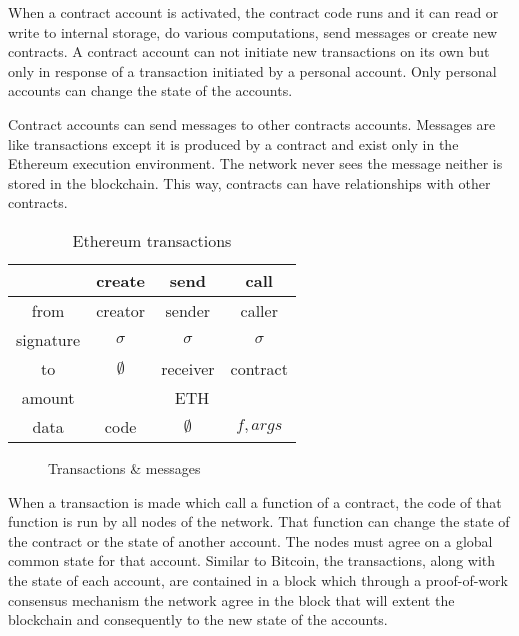 When a contract account is activated, the contract code runs and it can read or write to internal storage, do various computations, send messages or create new contracts. A contract account can not initiate new transactions on its own but only in response of a transaction initiated by a personal account. Only personal accounts can change the state of the accounts.

Contract accounts can send messages to other contracts accounts. Messages are like transactions except it is produced by a contract and exist only in the Ethereum execution environment. The network never sees the message neither is stored in the blockchain. This way, contracts can have relationships with other contracts.

\begin{table}[!ht]
  \centering
  \begin{tabular}{|c|c|c|c|}
  \hline
   & create & send & call \\ \hline
   from & creator & sender & caller \\ \hline
   signature & $\sigma$ & $\sigma$ & $\sigma$ \\ \hline
   to & $\emptyset$ & receiver & contract \\ \hline
   amount & \multicolumn{3}{c|}{ETH} \\ \hline
   data & code & $\emptyset$ & $f, args$ \\ \hline
  \end{tabular}
  \caption{Ethereum transactions}
  \label{fig:eth_transactions}
\end{table}

\begin{figure}[!ht]
  \centering
  \caption{Transactions \& messages}
  \label{fig:eth_transaction}
\end{figure}

When a transaction is made which call a function of a contract, the code of that function is run by all nodes of the network. That function can change the state of the contract or the state of another account. The nodes must agree on a global common state for that account. Similar to Bitcoin, the transactions, along with the state of each account, are contained in a block which through a proof-of-work consensus mechanism the network agree in the block that will extent the blockchain and consequently to the new state of the accounts.

